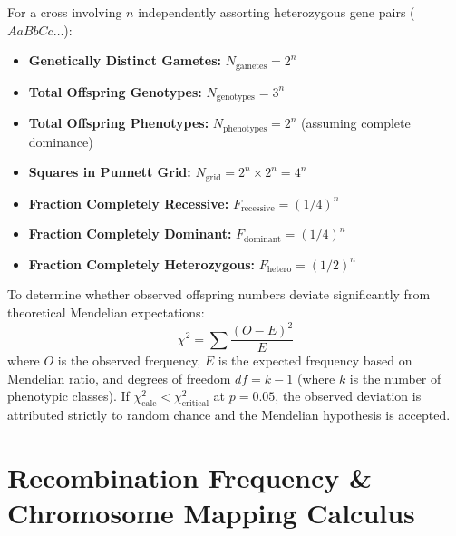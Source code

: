\documentclass[10pt,twoside,openright]{book}
\begin{document}
\begin{formulabox}
For a cross involving $n$ independently assorting heterozygous gene pairs ($AaBbCc\dots$):
\begin{itemize}[leftmargin=*]
  \item \textbf{Genetically Distinct Gametes:} $N_{\text{gametes}} = 2^n$
  \item \textbf{Total Offspring Genotypes:} $N_{\text{genotypes}} = 3^n$
  \item \textbf{Total Offspring Phenotypes:} $N_{\text{phenotypes}} = 2^n$ (assuming complete dominance)
  \item \textbf{Squares in Punnett Grid:} $N_{\text{grid}} = 2^n \times 2^n = 4^n$
  \item \textbf{Fraction Completely Recessive:} $F_{\text{recessive}} = (1/4)^n$
  \item \textbf{Fraction Completely Dominant:} $F_{\text{dominant}} = (1/4)^n$
  \item \textbf{Fraction Completely Heterozygous:} $F_{\text{hetero}} = (1/2)^n$
\end{itemize}
\end{formulabox}

\begin{usecasebox}
To determine whether observed offspring numbers deviate significantly from theoretical Mendelian expectations:
\begin{equation}
  \chi^2 = \sum \frac{(O - E)^2}{E}
\end{equation}
where $O$ is the observed frequency, $E$ is the expected frequency based on Mendelian ratio, and degrees of freedom $df = k - 1$ (where $k$ is the number of phenotypic classes). If $\chi^2_{\text{calc}} < \chi^2_{\text{critical}}$ at $p = 0.05$, the observed deviation is attributed strictly to random chance and the Mendelian hypothesis is accepted.
\end{usecasebox}

\section{Recombination Frequency \& Chromosome Mapping Calculus}
\end{document}
